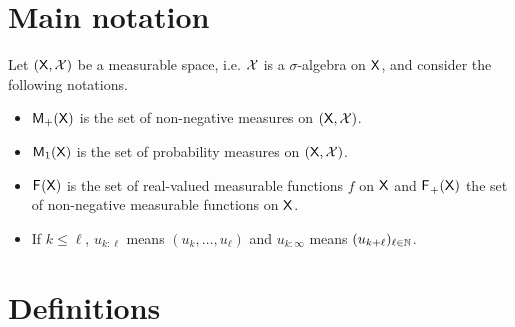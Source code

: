 \documentclass[english,graybox,envcountchap,envcountsame,sectrefs,shortlabels]{svmono}
\theoremstyle{style}
\begin{document}

\section{Main notation}

Let $(\mathsf{X},\mathcal{X})$ be a measurable space, i.e.  $\mathcal{X}$ is a $\sigma$-algebra on $\mathsf{X}$, and consider the following notations.
\begin{itemize}
\item $\mathsf{M}_{+}(\mathsf{X})$ is the set of non-negative measures on $(\mathsf{X},\mathcal{X})$.
\item $\mathsf{M}_{1}(\mathsf{X})$ is the set of probability measures on $(\mathsf{X},\mathcal{X})$.
\item $\mathsf{F_{}}(\mathsf{X})$ is the set of real-valued measurable functions
$f$ on $\mathsf{X}$ and $\mathsf{F_{}}_{+}(\mathsf{X})$ the set of non-negative measurable
functions on $\mathsf{X}$.
\item If $k\leq\ell$,  $u_{k:\ell}$ means $(u_{k},\ldots,u_{\ell})$ and $u_{k:\infty}$ means $(u_{k+\ell})_{\ell\in\mathbb{N}}$.
\end{itemize}

\section{Definitions}
\end{document}
